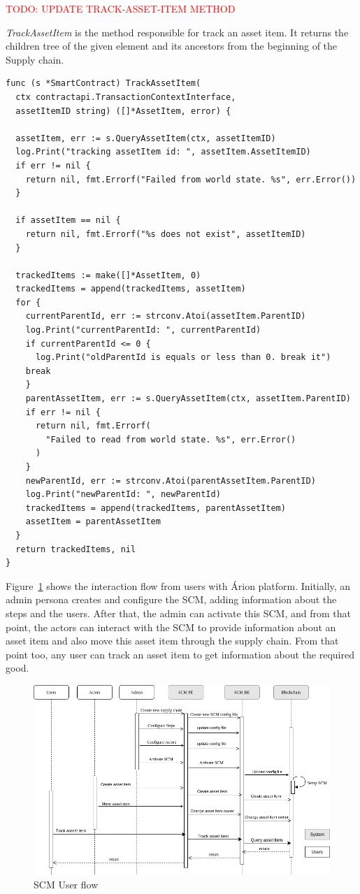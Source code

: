 \textcolor{red}{TODO: UPDATE TRACK-ASSET-ITEM METHOD}

\textit{TrackAssetItem} is the method responsible for track an asset item. It returns the children tree of the given element and its ancestors from the beginning of the Supply chain.

\begin{verbatim}
func (s *SmartContract) TrackAssetItem(
  ctx contractapi.TransactionContextInterface, 
  assetItemID string) ([]*AssetItem, error) {
  
  assetItem, err := s.QueryAssetItem(ctx, assetItemID)
  log.Print("tracking assetItem id: ", assetItem.AssetItemID)
  if err != nil {
    return nil, fmt.Errorf("Failed from world state. %s", err.Error())
  }

  if assetItem == nil {
    return nil, fmt.Errorf("%s does not exist", assetItemID)
  }

  trackedItems := make([]*AssetItem, 0)
  trackedItems = append(trackedItems, assetItem)
  for {
    currentParentId, err := strconv.Atoi(assetItem.ParentID)
    log.Print("currentParentId: ", currentParentId)
    if currentParentId <= 0 {
      log.Print("oldParentId is equals or less than 0. break it")
    break
    }
    parentAssetItem, err := s.QueryAssetItem(ctx, assetItem.ParentID)
    if err != nil {
      return nil, fmt.Errorf(
        "Failed to read from world state. %s", err.Error()
      )
    }
    newParentId, err := strconv.Atoi(parentAssetItem.ParentID)
    log.Print("newParentId: ", newParentId)
    trackedItems = append(trackedItems, parentAssetItem)
    assetItem = parentAssetItem
  }
  return trackedItems, nil
}
\end{verbatim}


Figure~\ref{fig:sequenceDiagram} shows the interaction flow from users with Árion platform. Initially, an admin persona creates and configure the SCM, adding information about the steps and the users. After that, the admin can activate this SCM, and from that point, the actors can interact with the SCM to provide information about an asset item and also move this asset item through the supply chain. From that point too, any user can track an asset item to get information about the required good.

\begin{figure}[ht]
\begin{center}
  \includegraphics[scale=0.5]{images/SequenceDiagram.png}
\caption{SCM User flow}
\label{fig:sequenceDiagram}
\end{center}
\end{figure}
